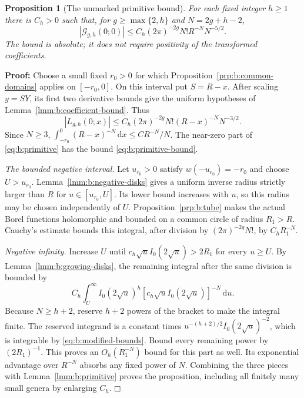 \documentclass[a4paper,10pt]{article}
\numberwithin{equation}{section}
\newcommand{\dd}{\mathrm{d}}
\theoremstyle{paperplain}
\newtheorem{prp}[thm]{Proposition}
\theoremstyle{paperremark}
\theoremstyle{paperplain}
\newenvironment{prf}{\noindent \textbf{Proof: }}{\hfill $\mdlgwhtsquare$\par\addvspace{0.5\baselineskip}}
\begin{document}
\begin{prp}[The unmarked primitive bound]\label{prp:b:primitive-bound}
For each fixed integer $h\geq1$ there is $C_h>0$ such that, for
$g\geq\max\{2,h\}$ and $N=2g+h-2$,
\begin{equation}\label{eq:b:primitive-bound}
 |\mathcal G_{g,h}(0;0)|
 \leq C_h(2\pi)^{-2g}N!R^{-N}N^{-5/2}.
\end{equation}
The bound is absolute; it does not require positivity of the
transformed coefficients.
\end{prp}
\begin{prf}
Choose a small fixed $r_0>0$ for which
Proposition~\ref{prp:b:common-domains} applies on $[-r_0,0]$.
On this interval put $S=R-x$. After scaling $y=S Y$, its first
two derivative bounds give the uniform hypotheses of
Lemma~\ref{lmm:b:coefficient-bound}. Thus
\[
 |L_{g,h}(0;x)|\leq C_h(2\pi)^{-2g}N!
                       (R-x)^{-N}N^{-3/2}.
\]
Since $N\geq3$,
$\int_{-r_0}^0(R-x)^{-N}\,\dd x\leq C R^{-N}/N$.
The near-zero part of \eqref{eq:b:primitive} has the bound
\eqref{eq:b:primitive-bound}.

\smallskip\noindent
\emph{The bounded negative interval.}
Let $u_{r_0}>0$ satisfy $w(-u_{r_0})=-r_0$ and choose
$U>u_{r_0}$. Lemma~\ref{lmm:b:negative-disks} gives a uniform
inverse radius strictly larger than $R$ for
$u\in[u_{r_0},U]$. Its lower bound increases with $u$, so
this radius may be chosen independently of $U$. Proposition~\ref{prp:b:tube} makes the
actual Borel functions holomorphic and bounded on a common circle
of radius $R_1>R$. Cauchy's estimate bounds this integral, after
division by $(2\pi)^{-2g}N!$, by $C_hR_1^{-N}$.

\smallskip\noindent
\emph{Negative infinity.}
Increase $U$ until $c_h\sqrt u I_0(2\sqrt u)>2R_1$ for every
$u\geq U$. By Lemma~\ref{lmm:b:growing-disks}, the remaining
integral after the same division is bounded by
\[
 C_h\int_U^\infty I_0(2\sqrt u)^h
              [c_h\sqrt u I_0(2\sqrt u)]^{-N}\,\dd u.
\]
Because $N\geq h+2$, reserve $h+2$ powers of the bracket to make
the integral finite. The reserved integrand is a constant times
$u^{-(h+2)/2}I_0(2\sqrt u)^{-2}$, which is integrable by
\eqref{eq:b:modified-bounds}. Bound every remaining power by
$(2R_1)^{-1}$. This proves an $O_h(R_1^{-N})$ bound for this
part as well. Its exponential advantage over $R^{-N}$ absorbs
any fixed power of $N$. Combining the three pieces with
Lemma~\ref{lmm:b:primitive} proves the proposition, including all
finitely many small genera by enlarging $C_h$.
\end{prf}
\end{document}
